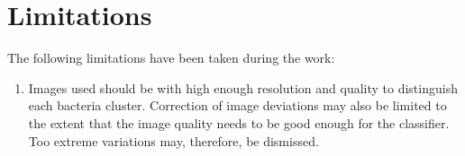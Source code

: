 \section{Limitations}
The following limitations have been taken during the work: 
\begin{enumerate}
    \item Images used should be with high enough resolution and quality to distinguish each bacteria cluster. Correction of image deviations may also be limited to the extent that the image quality needs to be good enough for the classifier. Too extreme variations may, therefore, be dismissed. 
\end{enumerate}





